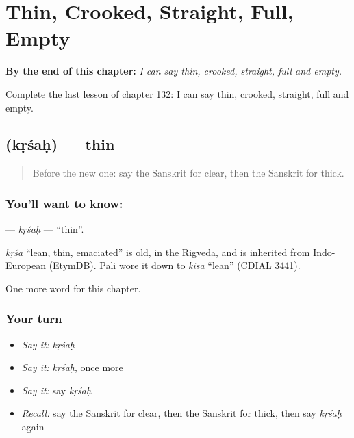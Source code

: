 
\chapter{Thin, Crooked, Straight, Full, Empty}
\label{ch:sa-thin-crooked-straight-full-empty}

\begin{chapteropening}
\textbf{By the end of this chapter:} \emph{I can say thin, crooked, straight, full and empty.}

Complete the last lesson of chapter 132: I can say thin, crooked, straight, full and empty.
\end{chapteropening}

\section[\texorpdfstring{\sk{कृशः} (kṛśaḥ)}{कृशः (kṛśaḥ)}]{ (kṛśaḥ) — thin}

\label{lesson:SA-C132-krsah}



\begin{quote}
Before the new one: say the Sanskrit for clear, then the Sanskrit for thick.
\end{quote}

\subsection*{You'll want to know: }
\textbf{} — \emph{kṛśaḥ} — \textquotedblleft{}thin\textquotedblright{}.

\begin{cousinweb}
\emph{kṛśa} \textquotedblleft{}lean, thin, emaciated\textquotedblright{} is old, in the Rigveda, and is inherited from Indo-European (EtymDB). Pali wore it down to \emph{kisa} \textquotedblleft{}lean\textquotedblright{} (CDIAL 3441).
\end{cousinweb}

\begin{grammarlens}[title={What you've built}]
One more word for this chapter.
\end{grammarlens}

\subsection*{Your turn}
\begin{itemize}
\raggedright
  \item \emph{Say it:} \emph{kṛśaḥ}
  \item \emph{Say it:} \emph{kṛśaḥ}, once more
  \item \emph{Say it:} say \emph{kṛśaḥ}
  \item \emph{Recall:} say the Sanskrit for clear, then the Sanskrit for thick, then say \emph{kṛśaḥ} again
\end{itemize}

